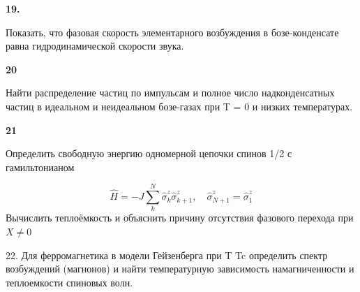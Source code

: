\documentclass[a4paper,12pt]{article} %
\begin{document}
\begin{ttask} \textbf{19.}
	 
Показать, что фазовая скорость элементарного возбуждения в бозе-конденсате равна гидродинамической скорости звука.


















\end{ttask}



\begin{ttask} \textbf{20}

Найти распределение частиц по импульсам и полное число надконденсатных частиц в идеальном и неидеальном бозе-газах при T = 0 и низких температурах.


















\end{ttask}



\begin{ttask} \textbf{21}

Определить свободную энергию одномерной цепочки спинов 1/2 с гамильтонианом

$$\hat{H}=-J \sum_{k}^{N} \hat{\sigma}_{k}^{z} \hat{\sigma}_{k+1}^{z}, \quad \hat{\sigma}_{N+1}^{z}=\hat{\sigma}_{1}^{z}$$
Вычислить теплоёмкость и объяснить причину отсутствия фазового перехода при $ X\ne 0 $
















\end{ttask}



\begin{ttask}

22. Для ферромагнетика в модели Гейзенберга при T  Tc определить спектр возбуждений (магнонов) и найти температурную зависимость намагниченности и теплоемкости спиновых волн.

















\end{ttask}
\end{document}
